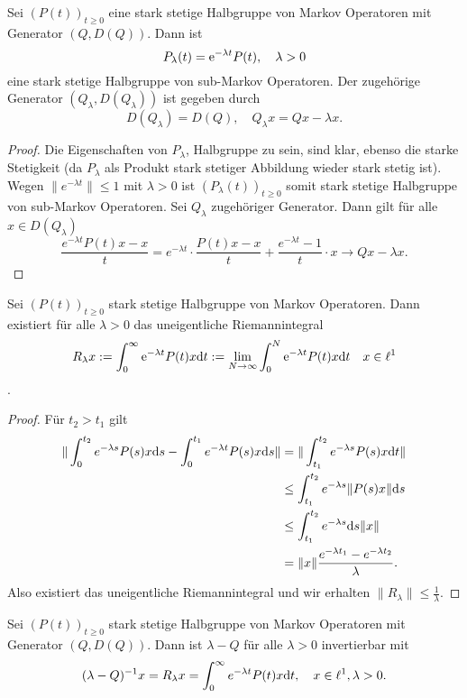 \begin{mem}
  Sei $(P(t))_{t\geq0}$ eine stark stetige Halbgruppe von Markov Operatoren mit Generator $(Q,D(Q))$. Dann ist  $$P_\lambda (t)=\textnormal{e}^{-\lambda t}P(t),\quad \lambda >0$$  eine  stark stetige Halbgruppe von sub-Markov Operatoren. Der zugehörige  Generator $(Q_\lambda, D(Q_\lambda))$ ist gegeben durch $$D(Q_\lambda)=D(Q),\quad Q_\lambda x=Qx -\lambda x.$$
\end{mem}

\begin{proof}
Die Eigenschaften von $P_\lambda$, Halbgruppe zu sein,  sind klar, ebenso die starke Stetigkeit (da $P_\lambda$ als Produkt stark stetiger Abbildung wieder stark stetig ist). Wegen $\|e^{-\lambda t}\|\leq 1$ mit $\lambda >0$ ist  $(P_\lambda(t))_{t\geq0}$ somit stark stetige Halbgruppe von sub-Markov Operatoren. Sei $Q_\lambda$ zugehöriger Generator. Dann gilt für alle $x\in D(Q_\lambda)$
$$\frac{e^{-\lambda t}P(t)x-x}{t}=e^{-\lambda t}\cdot\frac{P(t)x-x}{t}+\frac{e^{-\lambda t}-1}{t}\cdot x\to Qx-\lambda x.$$
\end{proof}



\begin{mem}
Sei $(P(t))_{t\geq0}$ stark stetige Halbgruppe von Markov Operatoren. Dann  existiert für alle $\lambda>0$ das uneigentliche Riemannintegral $$R_\lambda x:=\int_0^\infty \textnormal e^{-\lambda t}P(t)x\textnormal dt:=\lim_{N\to\infty}\int_0^N \textnormal e^{-\lambda t}P(t)x\textnormal dt\quad x\in\ell^1$$.
\end{mem}

\begin{proof}
Für $t_2>t_1$  gilt 
\begin{align}
\|\int_0^{t_2}e^{-\lambda s}P(s)x\text ds-\int_0^{t_1} e^{-\lambda t}P(s)x\text ds\|
&=\|\int_{t_1}^{t_2} e^{-\lambda s}P(s)x\text dt\|\\
&\leq \int_{t_1}^{t_2}e^{-\lambda s}\|P(s)x\|\text ds\\
&\leq \int_{t_1}^{t_2}e^{-\lambda s}\text ds\|x\|\\
&=\|x\|\frac{e^{-\lambda t_1}-e^{-\lambda t_2}}{\lambda}.
\end{align}
Also existiert das uneigentliche Riemannintegral und wir erhalten $\|R_\lambda\|\leq\frac{1}{\lambda}$.
\end{proof}


\begin{prop}
  Sei $(P(t))_{t\geq0}$ stark stetige Halbgruppe von Markov Operatoren mit Generator $(Q, D(Q))$. Dann ist $\lambda -Q$ für alle $\lambda >0$ invertierbar mit $$(\lambda -Q)^{-1}x=R_\lambda x=\int_0^\infty e^{-\lambda t}P(t)x\text dt,\quad x\in \ell^1,\lambda >0.$$
\end{prop}

